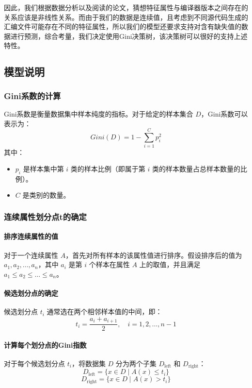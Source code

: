 因此，我们根据数据分析以及阅读的论文，猜想特征属性与编译器版本之间存在的关系应该是非线性关系。而由于我们的数据是连续值，且考虑到不同源代码生成的汇编文件可能存在不同的特征属性，所以我们的模型还要求支持对含有缺失值的数据进行预测，综合考量，我们决定使用Gini决策树，该决策树可以很好的支持上述特性。
    \subsection{模型说明}
    \subsubsection{Gini系数的计算}
Gini系数是衡量数据集中样本纯度的指标。对于给定的样本集合 \(D\)，Gini系数可以表示为：
\begin{equation}
Gini(D) = 1 - \sum_{i=1}^{C} p_i^2
\end{equation}
其中：
\begin{itemize}
  \item \(p_i\) 是样本集中第 \(i\) 类的样本比例（即属于第 \(i\) 类的样本数量占总样本数量的比例）。
  \item \(C\) 是类别的数量。
\end{itemize}
\vspace*{1cm}

\subsubsection{连续属性划分点t的确定}

\paragraph{排序连续属性的值}
对于一个连续属性 \(A\)，首先对所有样本的该属性值进行排序。假设排序后的值为 \(a_1, a_2, \dots, a_n\)，其中 \(a_i\) 是第 \(i\) 个样本在属性 \(A\) 上的取值，并且满足 \(a_1 \leq a_2 \leq \dots \leq a_n\)。

\paragraph{候选划分点的确定}
候选划分点 \(t_i\) 通常选在两个相邻样本值的中间，即：
\begin{equation}
t_i = \frac{a_i + a_{i+1}}{2}, \quad i = 1, 2, \dots, n-1
\end{equation}

\paragraph{计算每个划分点的Gini指数}
对于每个候选划分点 \(t_i\)，将数据集 \(D\) 分为两个子集 \(D_{\text{left}}\) 和 \(D_{\text{right}}\)：
\begin{equation}
D_{\text{left}} = \{x \in D \mid A(x) \leq t_i\}
\end{equation}
\begin{equation}
D_{\text{right}} = \{x \in D \mid A(x) > t_i\}
\end{equation}

